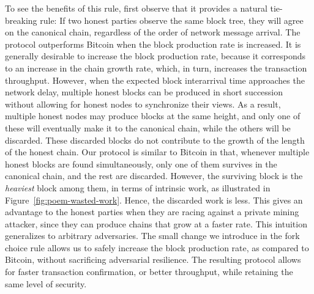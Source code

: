 To see the benefits of this rule, first observe that it provides a natural tie-breaking rule:
If two honest parties observe the same block tree, they will agree on
the canonical chain, regardless of the order of network message arrival. The \poem protocol
outperforms Bitcoin when the block production rate is increased. It is generally desirable
to increase the block production rate, because it corresponds to an increase in the chain growth
rate, which, in turn, increases the transaction throughput.
However, when the expected block interarrival time approaches the network delay, multiple honest blocks
can be produced in short succession without allowing for honest nodes to synchronize their views.
As a result, multiple honest nodes may produce blocks at the same height, and only one of these will
eventually make it to the canonical chain, while the others will be discarded. These discarded blocks
do not contribute to the growth of the length of the honest chain. Our protocol is similar to Bitcoin in that,
whenever multiple honest blocks are found simultaneously, only one of them survives in the canonical chain,
and the rest are discarded. However, the surviving block is the \emph{heaviest} block among them, in terms of intrinsic
work, as illustrated in Figure~\ref{fig:poem-wasted-work}. Hence, the discarded
work is less. This gives an advantage to the honest
parties when they are racing against a private mining attacker, since they can produce chains that grow
at a faster rate. This intuition generalizes to arbitrary adversaries.
The small change we introduce in the fork choice rule allows us to safely increase the block production
rate, as compared to Bitcoin, without sacrificing adversarial resilience. The resulting protocol
allows for faster transaction confirmation, or better throughput, while retaining the same level of security.

